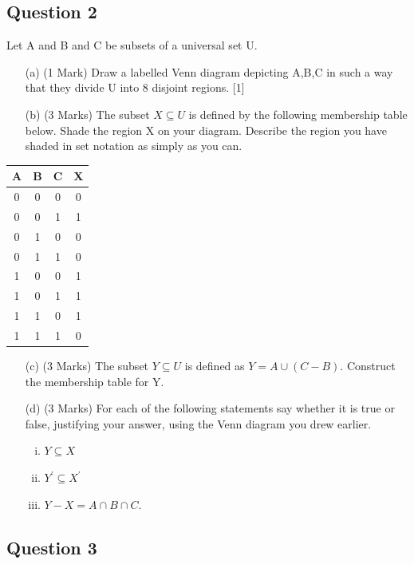 \documentclass[12pt]{article} %
\begin{document}
\subsection*{Question 2}
Let A and B and C be subsets of a universal set U.
\begin{itemize}
\item[(a)] (1 Mark) Draw a labelled Venn diagram depicting A,B,C in such a way that they divide
U into 8 disjoint regions. [1]
\item[(b)] (3 Marks) The subset $X \subseteq U$ is defined by the following membership table below. Shade the region X on your diagram. Describe the region you have shaded in
set notation as simply as you can. 
\end{itemize}
{\LARGE
\begin{center}
\begin{tabular}{|c|c|c|c|}
	\hline
	A & B & C & X \\ \hline
	0 & 0 & 0 & 0 \\ \hline
	0 & 0 & 1 & 1 \\ \hline
	0 & 1 & 0 & 0 \\ \hline
	0 & 1 & 1 & 0 \\ \hline
	1 & 0 & 0 & 1 \\ \hline
	1 & 0 & 1 & 1 \\ \hline
	1 & 1 & 0 & 1 \\ \hline
	1 & 1 & 1 & 0 \\ \hline
\end{tabular} 
\end{center}
}
\begin{itemize}
\item[(c)] (3 Marks) The subset $Y \subseteq U$ is defined as $Y = A \cup (C − B)$. Construct the membership
table for Y. 
\item[(d)] (3 Marks) For each of the following statements say whether it is true or false, justifying
your answer, using the Venn diagram you drew earlier.

\begin{enumerate}[(i)]
\item $Y \subseteq X$
\item $Y^{\prime} \subseteq X^{\prime}$
\item $Y − X = A \cap B \cap C$.
\end{enumerate}
\end{itemize}
\subsection*{Question 3}
\end{document}
